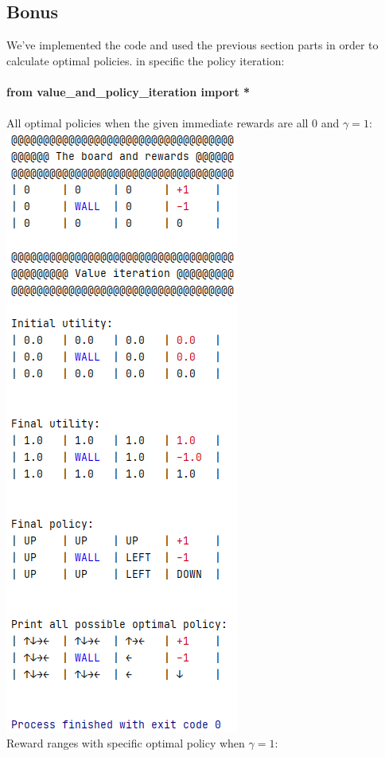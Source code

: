 \documentclass[12pt]{article}
\begin{document}
\subsection*{Bonus}
We've implemented the code and used the previous section parts in order to calculate optimal policies. in specific the policy iteration:\\
\\
\textbf{from value\_and\_policy\_iteration import *}\\
\newpage\\
All optimal policies when the given immediate rewards are all 0 and $\gamma=1$:\\
\includegraphics[]{hw3/plots/all_optimal_policies.PNG}
\newpage\\
Reward ranges with specific optimal policy when $\gamma=1$:\\
\end{document}
